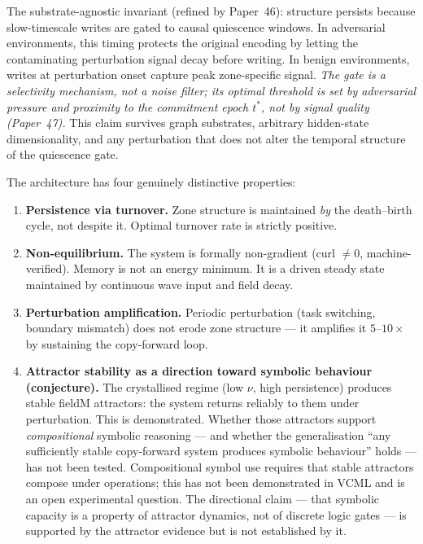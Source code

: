 \documentclass[11pt]{article}
\begin{document}
The substrate-agnostic invariant (refined by Paper~46):
structure persists because slow-timescale writes are gated to causal quiescence windows.
In adversarial environments, this timing protects the original encoding by letting
the contaminating perturbation signal decay before writing.
In benign environments, writes at perturbation onset capture peak zone-specific signal.
\emph{The gate is a selectivity mechanism, not a noise filter;
its optimal threshold is set by adversarial pressure and proximity to the
commitment epoch $t^*$, not by signal quality (Paper~47).}
This claim survives graph substrates, arbitrary hidden-state dimensionality, and any
perturbation that does not alter the temporal structure of the quiescence gate.

The architecture has four genuinely distinctive properties:
\begin{enumerate}[itemsep=3pt]
  \item \textbf{Persistence via turnover.} Zone structure is maintained \emph{by} the
        death--birth cycle, not despite it. Optimal turnover rate is strictly positive.
  \item \textbf{Non-equilibrium.} The system is formally non-gradient
        (curl $\neq 0$, machine-verified). Memory is not an energy minimum.
        It is a driven steady state maintained by continuous wave input and field decay.
  \item \textbf{Perturbation amplification.} Periodic perturbation (task switching,
        boundary mismatch) does not erode zone structure --- it amplifies it $5$--$10\times$
        by sustaining the copy-forward loop.
  \item \textbf{Attractor stability as a direction toward symbolic behaviour (conjecture).}
        The crystallised regime (low $\nu$, high persistence) produces stable fieldM attractors:
        the system returns reliably to them under perturbation.
        This is demonstrated.
        Whether those attractors support \emph{compositional} symbolic reasoning --- and whether
        the generalisation ``any sufficiently stable copy-forward system produces symbolic
        behaviour'' holds --- has not been tested.
        Compositional symbol use requires that stable attractors compose under operations;
        this has not been demonstrated in VCML and is an open experimental question.
        The directional claim --- that symbolic capacity is a property of attractor dynamics,
        not of discrete logic gates --- is supported by the attractor evidence but is not
        established by it.
\end{enumerate}
\end{document}
